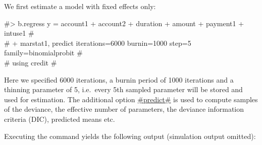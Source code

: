 We first estimate a model with fixed effects only:

#> b.regress  y = account1 + account2 + duration + amount + payment1 + intuse1 #\\
#  + marstat1, predict iterations=6000 burnin=1000 step=5 family=binomialprobit # \\
#  using credit #

Here we specified 6000 iterations, a burnin period of 1000
iterations and a thinning parameter of 5, i.e.~every 5th sampled
parameter will be stored and used for estimation. The additional
option \hyperref[predict]{#predict#} is used to compute samples of
the deviance, the effective number of parameters, the deviance
information criteria (DIC), predicted means etc.

Executing the command yields the following output (simulation
output omitted):

\small

